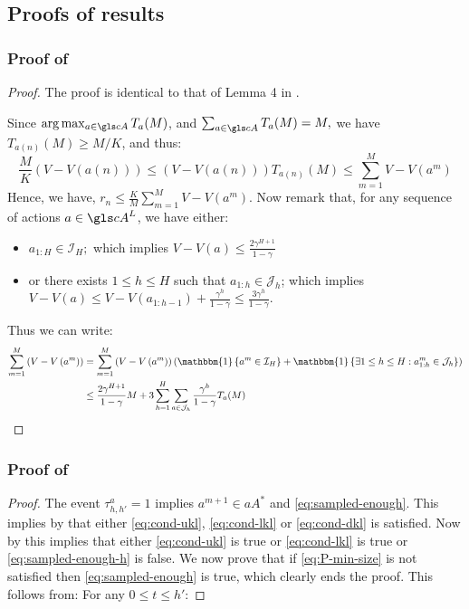 \begin{subappendices}
\subsection{Proofs of \KLOLOP results}
\label{sec:kl-olop-proofs}

\subsubsection{Proof of }
\begin{proof}
	The proof is identical to that of Lemma 4 in \citep{Bubeck2010}.
	
	Since $\arg \max _{a \in \cA} T_{a}(M)$, and $\sum_{a \in \cA} T_{a}(M)=M,$ we have $T_{a(n)}(M) \geq M / K$, and thus:
	\begin{equation*}
	\frac{M}{K}(V-V(a(n))) \leq(V-V(a(n))) T_{a(n)}(M) \leq \sum_{m=1}^{M} V-V\left(a^{m}\right)
	\end{equation*}
	Hence, we have, $r_{n} \leq \frac{K}{M} \sum_{m=1}^{M} V-V\left(a^{m}\right)$. Now remark that, for any sequence of actions $a\in \cA^L$, we have either:
	\begin{itemize}
		\item $a_{1 : H} \in \mathcal{I}_{H} ;$ which implies $V-V(a) \leq \frac{2 \gamma^{H+1}}{1-\gamma}$
		\item or there exists $1\leq h \leq H$ such that $a_{1:h} \in \mathcal{J}_h$; which implies $V-V(a) \leq V-V\left(a_{1 : h-1}\right)+\frac{\gamma^{h}}{1-\gamma} \leq \frac{3 \gamma^{h}}{1-\gamma}$.
	\end{itemize}
	Thus we can write:
	\begin{equation*}
	\begin{aligned} \sum_{m=1}^{M}\left(V-V\left(a^{m}\right)\right) &=\sum_{m=1}^{M}\left(V-V\left(a^{m}\right)\right)\left(\mathbbm{1}\left\{a^{m} \in \mathcal{I}_{H}\right\}+\mathbbm{1}\left\{\exists 1 \leq h \leq H : a_{1 : h}^{m} \in \mathcal{J}_{h}\right\}\right) \\ & \leq \frac{2 \gamma^{H+1}}{1-\gamma} M+3 \sum_{h=1}^{H} \sum_{a \in \mathcal{J}_{h}} \frac{\gamma^{h}}{1-\gamma} T_{a}(M) \end{aligned}
	\end{equation*}
	
\end{proof}

\subsubsection{Proof of }
\begin{proof}
	The event $\tau^a_{h,h'}=1$ implies $a^{m+1}\in a A^*$ and \eqref{eq:sampled-enough}. This implies by  that either \eqref{eq:cond-ukl}, \eqref{eq:cond-lkl} or \eqref{eq:cond-dkl} is satisfied. Now by  this implies that either \eqref{eq:cond-ukl} is true or \eqref{eq:cond-lkl} is true or \eqref{eq:sampled-enough-h} is false. We now prove that if \eqref{eq:P-min-size} is not satisfied then \eqref{eq:sampled-enough} is true, which clearly ends the proof.
	This follows from: For any $0 \leq t \leq h'$:
	

\end{proof}
\end{subappendices}
